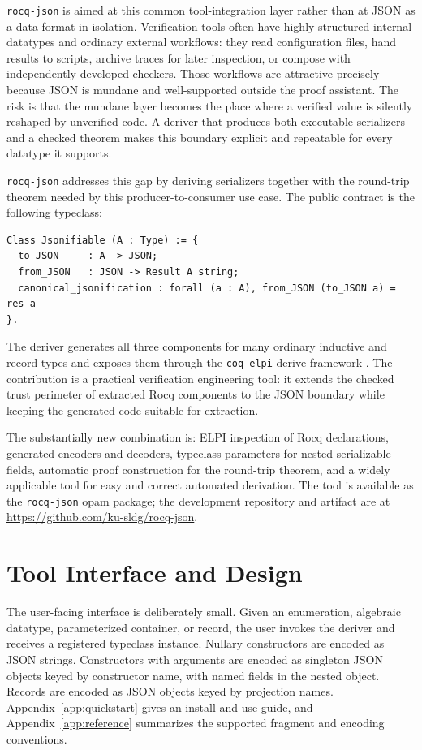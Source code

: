 \documentclass[runningheads]{llncs}
\newcommand{\coqelpi}{\texttt{coq-elpi}\xspace}
\begin{document}
\texttt{rocq-json} is aimed at this common tool-integration layer rather than at
JSON as a data format in isolation.  Verification tools often have highly
structured internal datatypes and ordinary external workflows: they read
configuration files, hand results to scripts, archive traces for later
inspection, or compose with independently developed checkers.  Those workflows
are attractive precisely because JSON is mundane and well-supported outside the
proof assistant.  The risk is that the mundane layer becomes the place where a
verified value is silently reshaped by unverified code.  A deriver that produces
both executable serializers and a checked theorem makes this boundary explicit
and repeatable for every datatype it supports.

\texttt{rocq-json} addresses this gap by deriving serializers together with the
round-trip theorem needed by this producer-to-consumer use case.  The public
contract is the following typeclass:

\begin{lstlisting}[language=Coq]
Class Jsonifiable (A : Type) := {
  to_JSON     : A -> JSON;
  from_JSON   : JSON -> Result A string;
  canonical_jsonification : forall (a : A), from_JSON (to_JSON a) = res a
}.
\end{lstlisting}

The deriver generates all three components for many ordinary inductive and
record types and exposes them through the \coqelpi derive framework
\cite{Tassi:2025:ELPI}.  The contribution is a practical verification
engineering tool: it extends the checked trust perimeter
of extracted Rocq components to the JSON boundary while keeping the generated
code suitable for extraction.

The substantially new combination is: ELPI inspection of Rocq declarations,
generated encoders and decoders, typeclass parameters for nested serializable
fields, automatic proof construction for the round-trip theorem, and a
widely applicable tool for easy and correct automated derivation.  The
tool is available as the \texttt{rocq-json} opam package; the development
repository and artifact are at \url{https://github.com/ku-sldg/rocq-json}.

\section{Tool Interface and Design}

The user-facing interface is deliberately small.  Given an enumeration,
algebraic datatype, parameterized container, or record, the user invokes the
deriver and receives a registered typeclass instance.  Nullary constructors are
encoded as JSON strings.  Constructors with arguments are encoded as singleton
JSON objects keyed by constructor name, with named fields in the nested object.
Records are encoded as JSON objects keyed by projection names.
Appendix~\ref{app:quickstart} gives an install-and-use guide, and
Appendix~\ref{app:reference} summarizes the supported fragment and encoding
conventions.
\end{document}
